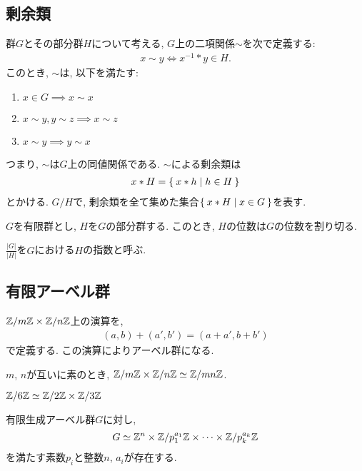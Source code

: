 \subsection{剰余類}
  群$G$とその部分群$H$について考える,
  $G$上の二項関係$\sim$を次で定義する:
  \begin{align*}
    x\sim y\iff x^{-1}\ast y\in H.
  \end{align*}
  このとき, $\sim$は, 以下を満たす:
  \begin{enumerate}
    \item $x\in G \implies x\sim x$
    \item $x\sim y, y\sim z \implies x\sim z$
    \item $x\sim y \implies y\sim x$
  \end{enumerate}
  つまり, $\sim$は$G$上の同値関係である.
  $\sim$による剰余類は
  \begin{align*}
    x\ast H = \Set{x\ast h|h\in H} 
  \end{align*}
  とかける.
  $G/H$で, 剰余類を全て集めた集合$\Set{x\ast H| x\in G}$を表す.

  \begin{theorem}
    $G$を有限群とし, $H$を$G$の部分群する.
    このとき, $H$の位数は$G$の位数を割り切る.
  \end{theorem}
  \begin{definition}
    $\frac{|G|}{|H|}$を$G$における$H$の指数と呼ぶ.
  \end{definition}


  \subsection{有限アーベル群}
  $\mathbb{Z}/m\mathbb{Z} \times \mathbb{Z}/n\mathbb{Z}$上の演算を,
  \begin{align*}
    (a,b)+(a',b') = (a+a',b+b')
  \end{align*}
  で定義する.
  この演算によりアーベル群になる.
  \begin{theorem}
    $m$, $n$が互いに素のとき, $\mathbb{Z}/m\mathbb{Z} \times \mathbb{Z}/n\mathbb{Z} \simeq \mathbb{Z}/mn\mathbb{Z}$.
  \end{theorem}
  \begin{example}
    $\mathbb{Z}/6\mathbb{Z}\simeq \mathbb{Z}/2\mathbb{Z}\times \mathbb{Z}/3\mathbb{Z}$
  \end{example}
    
  
  \begin{theorem}
    [有限生成アーベル群の基本定理]
    有限生成アーベル群$G$に対し,
    \begin{align*}
      G\simeq \mathbb{Z}^n \times \mathbb{Z}/p_1^{a_1} \mathbb{Z} \times \cdots \times \mathbb{Z}/p_k^{a_k}\mathbb{Z}
    \end{align*}
    を満たす素数$p_i$と整数$n$, $a_i$が存在する.
  \end{theorem}


